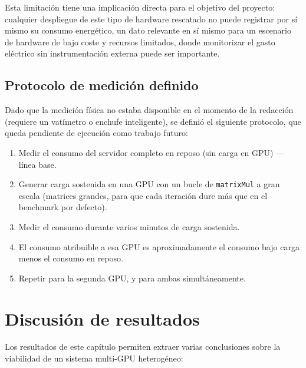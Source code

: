 Esta limitación tiene una implicación directa para el objetivo del proyecto: cualquier despliegue de este tipo de hardware rescatado no puede registrar por sí mismo su consumo energético, un dato relevante en sí mismo para un escenario de hardware de bajo coste y recursos limitados, donde monitorizar el gasto eléctrico sin instrumentación externa puede ser importante.

\subsection{Protocolo de medición definido}

Dado que la medición física no estaba disponible en el momento de la redacción (requiere un vatímetro o enchufe inteligente), se definió el siguiente protocolo, que queda pendiente de ejecución como trabajo futuro:

\begin{enumerate}
    \item Medir el consumo del servidor completo en reposo (sin carga en GPU) --- línea base.
    \item Generar carga sostenida en una GPU con un bucle de \texttt{matrixMul} a gran escala (matrices grandes, para que cada iteración dure más que en el benchmark por defecto).
    \item Medir el consumo durante varios minutos de carga sostenida.
    \item El consumo atribuible a esa GPU es aproximadamente el consumo bajo carga menos el consumo en reposo.
    \item Repetir para la segunda GPU, y para ambas simultáneamente.
\end{enumerate}

\section{Discusión de resultados}

Los resultados de este capítulo permiten extraer varias conclusiones sobre la viabilidad de un sistema multi-GPU heterogéneo:


